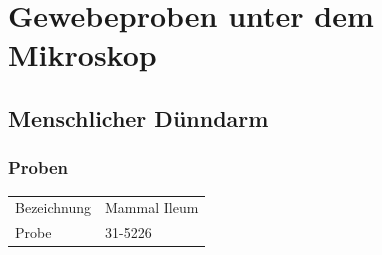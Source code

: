 \section{Gewebeproben unter dem Mikroskop}

\subsection{Menschlicher Dünndarm}

\subsubsection{Proben}
\begin{table}[h!]
	\centering
	\begin{tabular}{l l}
		Bezeichnung	& Mammal Ileum \\
		Probe 		& 31-5226
	\end{tabular}
\end{table}

